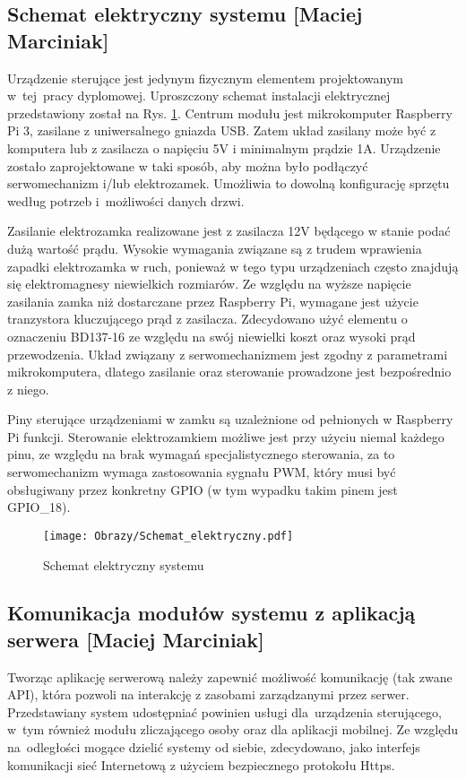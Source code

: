 \subsection{Schemat elektryczny systemu [Maciej Marciniak]}\label{sec:Schemat elektryczny zamka}
Urządzenie sterujące jest jedynym fizycznym elementem projektowanym w~tej~pracy  dyplomowej. Uproszczony schemat instalacji elektrycznej przedstawiony został na Rys. \ref{schemat:schemat elektryczny systemu}. Centrum modułu jest mikrokomputer \linebreak Raspberry Pi 3, zasilane z uniwersalnego gniazda USB. Zatem układ zasilany może być z komputera lub z zasilacza o napięciu 5V i minimalnym prądzie 1A. Urządzenie zostało zaprojektowane w taki sposób, aby można było podłączyć serwomechanizm i/lub elektrozamek. Umożliwia to dowolną konfigurację sprzętu według potrzeb i~możliwości danych drzwi. 

Zasilanie elektrozamka realizowane jest z zasilacza 12V będącego w stanie podać dużą wartość prądu. Wysokie wymagania związane są z trudem wprawienia zapadki elektrozamka w ruch, ponieważ w tego typu urządzeniach często znajdują się elektromagnesy niewielkich rozmiarów. Ze względu na wyższe napięcie zasilania zamka niż dostarczane przez Raspberry Pi, wymagane jest użycie tranzystora kluczującego prąd z zasilacza. Zdecydowano użyć elementu o oznaczeniu BD137-16 ze względu na swój niewielki koszt oraz wysoki prąd przewodzenia. Układ związany z serwomechanizmem jest zgodny z parametrami mikrokomputera, dlatego zasilanie oraz sterowanie prowadzone jest bezpośrednio z niego.

Piny sterujące urządzeniami w zamku są uzależnione od pełnionych w Raspberry Pi funkcji. Sterowanie elektrozamkiem możliwe jest przy użyciu niemal każdego pinu, ze względu na brak wymagań specjalistycznego sterowania, za to serwomechanizm wymaga zastosowania sygnału PWM, który musi być obsługiwany przez konkretny GPIO (w tym wypadku takim pinem jest GPIO\_18)\cite{RP3}.
\newpage
\begin{figure}[!h]
	\centering
	\texttt{[image: Obrazy/Schemat\_elektryczny.pdf]}
	\caption{Schemat elektryczny systemu}
	\label{schemat:schemat elektryczny systemu}
\end{figure}
\newpage

\subsection{Komunikacja modułów systemu z aplikacją  serwera [Maciej Marciniak]}\label{Komunikacja serwer}
Tworząc aplikację serwerową należy zapewnić możliwość komunikację (tak zwane API), która pozwoli na interakcję z zasobami zarządzanymi przez serwer. Przedstawiany system udostępniać powinien usługi dla~urządzenia sterującego, w~tym również modułu zliczającego osoby oraz dla aplikacji mobilnej. Ze względu na~odległości mogące dzielić systemy od siebie, zdecydowano, jako interfejs komunikacji sieć Internetową z użyciem bezpiecznego protokołu Https. 
